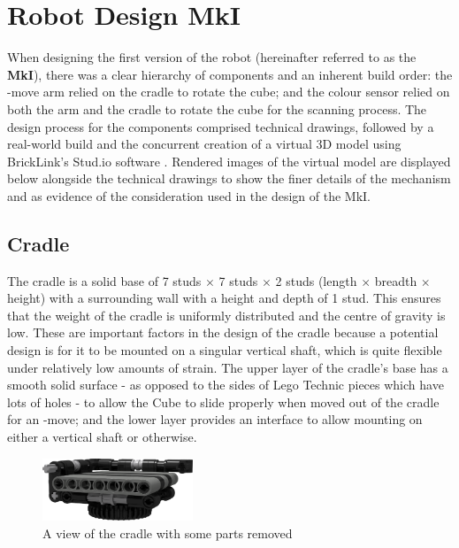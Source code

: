 \documentclass{report}
\newcommand{\tbo}[1]{\textbf{#1}}
\newcommand{\move}[1]{\uppercase{\texttt{\formatmovesnospace{#1}}}-move}
\begin{document}
    \section{Robot Design MkI}
    
	When designing the first version of the robot (hereinafter referred to as the \tbo{MkI}), there was a clear hierarchy of components and an inherent build order: the \move{x} arm relied on the cradle to rotate the cube; and the colour sensor relied on both the arm and the cradle to rotate the cube for the scanning process. The design process for the components comprised technical drawings, followed by a real-world build and the concurrent creation of a virtual 3D model using BrickLink's Stud.io software \cite{BrickLink2016}. Rendered images of the virtual model are displayed below alongside the technical drawings to show the finer details of the mechanism and as evidence of the consideration used in the design of the MkI.
    
	\subsection{Cradle}
	
	The cradle is a solid base of 7 studs $\times$ 7 studs $\times$ 2 studs (length $\times$ breadth $\times$ height) with a surrounding wall with a height and depth of 1 stud. This ensures that the weight of the cradle is uniformly distributed and the centre of gravity is low. These are important factors in the design of the cradle because a potential design is for it to be mounted on a singular vertical shaft, which is quite flexible under relatively low amounts of strain. The upper layer of the cradle's base has a smooth solid surface - as opposed to the sides of Lego Technic pieces which have lots of holes - to allow the Cube to slide properly when moved out of the cradle for an \move{x}; and the lower layer provides an interface to allow mounting on either a vertical shaft or otherwise.
	
	\begin{figure}[H]
		\begin{center}
			\includegraphics[width=0.4\textwidth]{Resources/Images/rdrCradle.png}
			\caption{A view of the cradle with some parts removed}
			\label{fig:rdrCradle}
		\end{center}
	\end{figure}
	
\end{document}
